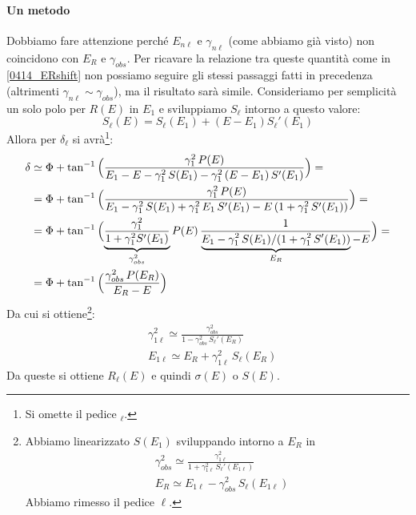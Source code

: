 \paragraph{Un metodo } Dobbiamo fare attenzione perché $E_{n\ell}$ e $\gamma_{n\ell}$ (come abbiamo già visto) non coincidono con $E_R$ e $\gamma_{obs}$. Per ricavare la relazione tra queste quantità come in \eqref{0414_ERshift} non possiamo seguire gli stessi passaggi fatti in precedenza (altrimenti $\gamma_{n\ell} \sim \gamma_{obs}$), ma il risultato sarà simile. Consideriamo per semplicità un solo polo per $R(E)$ in $E_1$ e sviluppiamo $S_\ell$ intorno a questo valore:
$$S_\ell(E) = S_\ell(E_1) + (E-E_1) S_\ell'(E_1)$$
Allora per $\delta_\ell$ si avrà\footnote{Si omette il pedice $_\ell$.}:
\begin{align*}
	\delta &\simeq \Phi + \tan^{-1}{\Bigl ( \frac{\gamma_1^2 \, P(E)}{E_1 - E - \gamma^2_1 \, S(E_1)-\gamma^2_1 \, (E-E_1) \, S'(E_1)} \Bigr )} = \\
	&= \Phi + \tan^{-1}{\Bigl ( \frac{\gamma_1^2 \, P(E)}{E_1 - \gamma^2_1 \, S(E_1)+\gamma^2_1 \, E_1 \, S'(E_1) - E \, (1+\gamma^2_1 \, S'(E_1))} \Bigr )} = \\
	&= \Phi + \tan^{-1}{\Bigl ( \underbrace{\frac{\gamma_1^2}{1+\gamma^2_1 S'(E_1)}}_{\gamma^2_{obs}} P(E) \, \frac{1}{\underbrace{E_1 - \gamma_1^2 \, S(E_1)/(1+\gamma_1^2\, S'(E_1))}_{E_R} - E} \Bigr )} = \\
	&= \Phi + \tan^{-1}{\Bigl ( \frac{\gamma^2_{obs}\, P(E_R)}{E_R - E} \Bigr )}
\end{align*}
Da cui si ottiene\footnote{Abbiamo linearizzato $S(E_1)$ sviluppando intorno a $E_R$ in
\begin{align*}
	&\gamma_{obs}^2 \simeq \frac{\gamma_{1\ell}^2}{1+\gamma_{1\ell}^2\, S_{\ell}'(E_{1\ell})}  \\
	&E_{R} \simeq E_{1\ell} - \gamma^2_{obs} \, S_\ell (E_{1\ell}) 	
\end{align*}
Abbiamo rimesso il pedice $\ell$.}:
\begin{align}
	&\gamma_{1\ell}^2 \simeq \frac{\gamma_{obs}^2}{1-\gamma_{obs}^2\, S_{\ell}'(E_R)} \label{0414_gamma1} \\
	&E_{1\ell} \simeq E_R + \gamma^2_{1\ell} \, S_\ell (E_R) \label{0414_E1}
\end{align}
Da queste si ottiene $R_\ell(E)$ e quindi $\sigma(E)$ o $S(E)$.

